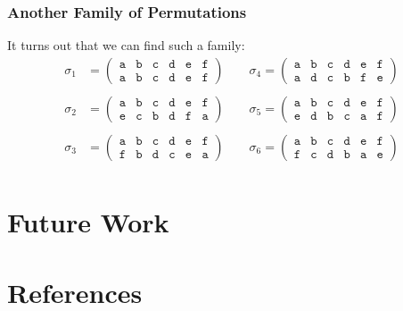 \documentclass[aspectratio=169]{beamer}
\begin{document}
\begin{frame}[triangle=siiblue]
\frametitle{Another Family of Permutations}
It turns out that we can find such a family:
\vfill
\begin{align*}
	\sigma_1 &= \begin{pmatrix}
		\texttt{a} & \texttt{b} & \texttt{c} & \texttt{d} & \texttt{e} & \texttt{f} \\
		\texttt{a} & \texttt{b} & \texttt{c} & \texttt{d} & \texttt{e} & \texttt{f}
		\end{pmatrix}
	\qquad
	\sigma_4 = \begin{pmatrix}
		\texttt{a} & \texttt{b} & \texttt{c} & \texttt{d} & \texttt{e} & \texttt{f} \\
		\texttt{a} & \texttt{d} & \texttt{c} & \texttt{b} & \texttt{f} & \texttt{e}
		\end{pmatrix} \\ \\
	\sigma_2 &= \begin{pmatrix}
		\texttt{a} & \texttt{b} & \texttt{c} & \texttt{d} & \texttt{e} & \texttt{f} \\
		\texttt{e} & \texttt{c} & \texttt{b} & \texttt{d} & \texttt{f} & \texttt{a}
		\end{pmatrix}
	\qquad
	\sigma_5 = \begin{pmatrix}
		\texttt{a} & \texttt{b} & \texttt{c} & \texttt{d} & \texttt{e} & \texttt{f} \\
		\texttt{e} & \texttt{d} & \texttt{b} & \texttt{c} & \texttt{a} & \texttt{f}
		\end{pmatrix} \\ \\
	\sigma_3 &= \begin{pmatrix}
		\texttt{a} & \texttt{b} & \texttt{c} & \texttt{d} & \texttt{e} & \texttt{f} \\
		\texttt{f} & \texttt{b} & \texttt{d} & \texttt{c} & \texttt{e} & \texttt{a}
		\end{pmatrix}
	\qquad
	\sigma_6 = \begin{pmatrix}
		\texttt{a} & \texttt{b} & \texttt{c} & \texttt{d} & \texttt{e} & \texttt{f} \\
		\texttt{f} & \texttt{c} & \texttt{d} & \texttt{b} & \texttt{a} & \texttt{e}
		\end{pmatrix} \\
\end{align*}

\end{frame}
\section{Future Work}
\begin{frame}[Triangle=siiorange]
	\tocpage
\end{frame}


\section{References}
\begin{frame}[Triangle=siiorange]
	\tocpage
\end{frame}
\end{document}
